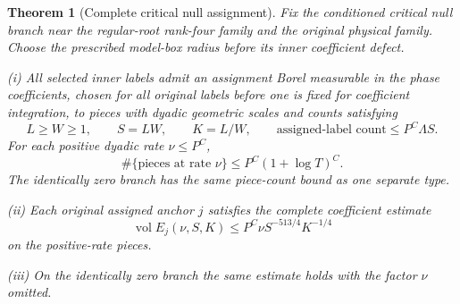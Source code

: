 \documentclass[11pt]{amsart}
\newtheorem{theorem}{Theorem}[section]
\theoremstyle{definition}
\theoremstyle{remark}
\numberwithin{equation}{section}
\begin{document}
\begin{theorem}[Complete critical null assignment]\label{low:6:as36:all-surface}
Fix the conditioned critical null branch near the regular-root rank-four family and the original physical family. Choose the prescribed model-box radius before its inner coefficient defect.

\noindent\textup{(i)} All selected inner labels admit an assignment Borel measurable in the phase coefficients, chosen for all original labels before one is fixed for coefficient integration, to pieces with dyadic geometric scales and counts satisfying
\[
L\ge W\ge1,\qquad S=LW,\qquad K=L/W,\qquad \text{assigned-label count}\le P^C\Lambda S.
\]
For each positive dyadic rate $\nu\le P^C$,
\[
\#\{\text{pieces at rate }\nu\}\le P^C(1+\log T)^C.
\]
The identically zero branch has the same piece-count bound as one separate type.

\noindent\textup{(ii)} Each original assigned anchor $j$ satisfies the complete coefficient estimate
\begin{equation}\label{low:6:as36:uniform-tail}
\operatorname{vol}E_j(\nu,S,K)\le P^C\nu S^{-513/4}K^{-1/4}
\end{equation}
on the positive-rate pieces.

\noindent\textup{(iii)} On the identically zero branch the same estimate holds with the factor $\nu$ omitted.
\end{theorem}
\end{document}
